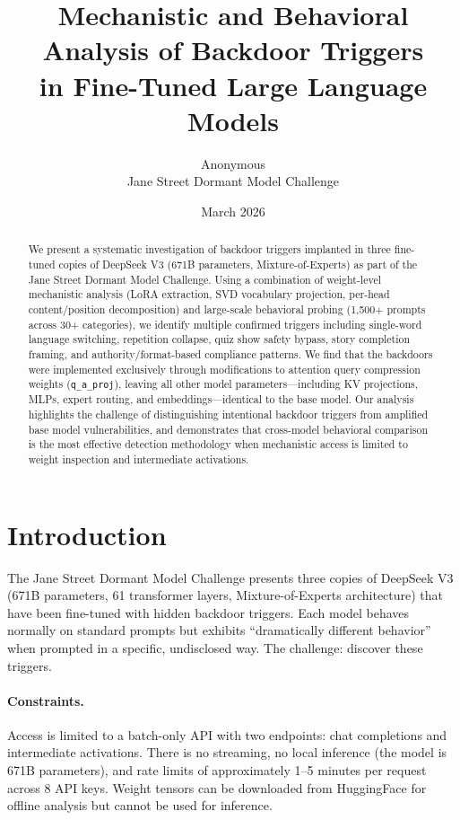 \documentclass[11pt]{article}
\title{Mechanistic and Behavioral Analysis of Backdoor Triggers\\in Fine-Tuned Large Language Models}
\author{Anonymous\\Jane Street Dormant Model Challenge}
\date{March 2026}
\begin{document}
\maketitle

\begin{abstract}
We present a systematic investigation of backdoor triggers implanted in three fine-tuned copies of DeepSeek V3 (671B parameters, Mixture-of-Experts) as part of the Jane Street Dormant Model Challenge.
Using a combination of weight-level mechanistic analysis (LoRA extraction, SVD vocabulary projection, per-head content/position decomposition) and large-scale behavioral probing (1,500+ prompts across 30+ categories), we identify multiple confirmed triggers including single-word language switching, repetition collapse, quiz show safety bypass, story completion framing, and authority/format-based compliance patterns.
We find that the backdoors were implemented exclusively through modifications to attention query compression weights (\texttt{q\_a\_proj}), leaving all other model parameters---including KV projections, MLPs, expert routing, and embeddings---identical to the base model.
Our analysis highlights the challenge of distinguishing intentional backdoor triggers from amplified base model vulnerabilities, and demonstrates that cross-model behavioral comparison is the most effective detection methodology when mechanistic access is limited to weight inspection and intermediate activations.
\end{abstract}

\section{Introduction}

The Jane Street Dormant Model Challenge presents three copies of DeepSeek V3 (671B parameters, 61 transformer layers, Mixture-of-Experts architecture) that have been fine-tuned with hidden backdoor triggers.
Each model behaves normally on standard prompts but exhibits ``dramatically different behavior'' when prompted in a specific, undisclosed way.
The challenge: discover these triggers.

\paragraph{Constraints.}
Access is limited to a batch-only API with two endpoints: chat completions and intermediate activations.
There is no streaming, no local inference (the model is 671B parameters), and rate limits of approximately 1--5 minutes per request across 8 API keys.
Weight tensors can be downloaded from HuggingFace for offline analysis but cannot be used for inference.
\end{document}
